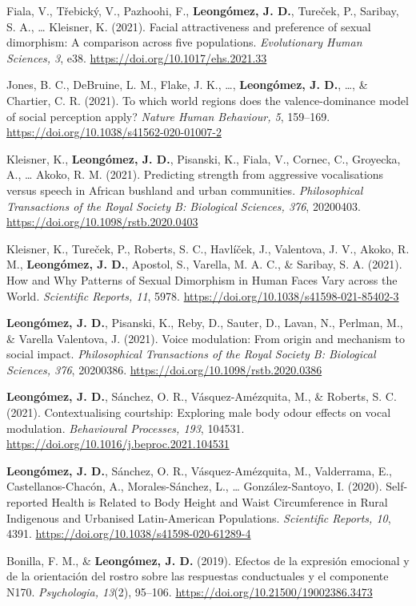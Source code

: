 \documentclass[11pt,a4paper,]{awesome-cv}
\begin{document}
Fiala, V., Třebický, V., Pazhoohi, F., \textbf{Leongómez, J. D.},
Tureček, P., Saribay, S. A., \ldots{} Kleisner, K. (2021). Facial
attractiveness and preference of sexual dimorphism: A comparison across
five populations. \emph{Evolutionary Human Sciences, 3}, e38.
\url{https://doi.org/10.1017/ehs.2021.33}

Jones, B. C., DeBruine, L. M., Flake, J. K., \ldots,
\textbf{Leongómez, J. D.}, \ldots, \& Chartier, C. R. (2021). To which
world regions does the valence-dominance model of social perception
apply? \emph{Nature Human Behaviour, 5}, 159--169.
\url{https://doi.org/10.1038/s41562-020-01007-2}

Kleisner, K., \textbf{Leongómez, J. D.}, Pisanski, K., Fiala, V.,
Cornec, C., Groyecka, A., \ldots{} Akoko, R. M. (2021). Predicting
strength from aggressive vocalisations versus speech in African bushland
and urban communities. \emph{Philosophical Transactions of the Royal
Society B: Biological Sciences, 376}, 20200403.
\url{https://doi.org/10.1098/rstb.2020.0403}

Kleisner, K., Tureček, P., Roberts, S. C., Havlíček, J., Valentova, J.
V., Akoko, R. M., \textbf{Leongómez, J. D.}, Apostol, S., Varella, M. A.
C., \& Saribay, S. A. (2021). How and Why Patterns of Sexual Dimorphism
in Human Faces Vary across the World. \emph{Scientific Reports, 11},
5978. \url{https://doi.org/10.1038/s41598-021-85402-3}

\textbf{Leongómez, J. D.}, Pisanski, K., Reby, D., Sauter, D., Lavan,
N., Perlman, M., \& Varella Valentova, J. (2021). Voice modulation: From
origin and mechanism to social impact. \emph{Philosophical Transactions
of the Royal Society B: Biological Sciences, 376}, 20200386.
\url{https://doi.org/10.1098/rstb.2020.0386}

\textbf{Leongómez, J. D.}, Sánchez, O. R., Vásquez-Amézquita, M., \&
Roberts, S. C. (2021). Contextualising courtship: Exploring male body
odour effects on vocal modulation. \emph{Behavioural Processes, 193},
104531. \url{https://doi.org/10.1016/j.beproc.2021.104531}

\textbf{Leongómez, J. D.}, Sánchez, O. R., Vásquez-Amézquita, M.,
Valderrama, E., Castellanos-Chacón, A., Morales-Sánchez, L., \ldots{}
González-Santoyo, I. (2020). Self-reported Health is Related to Body
Height and Waist Circumference in Rural Indigenous and Urbanised
Latin-American Populations. \emph{Scientific Reports, 10}, 4391.
\url{https://doi.org/10.1038/s41598-020-61289-4}

Bonilla, F. M., \& \textbf{Leongómez, J. D.} (2019). Efectos de la
expresión emocional y de la orientación del rostro sobre las respuestas
conductuales y el componente N170. \emph{Psychologia, 13}(2), 95--106.
\url{https://doi.org/10.21500/19002386.3473}
\end{document}

